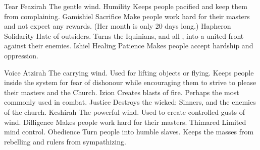 \begin{gloss}
\begin{description}
\begin{comment}
\subparagraph{Tear}
\end{comment}
\begin{sephirahlist}{Tear}
\sephitem
  {\Feazirah}
  {Feazirah}
  {\female}
  {The gentle wind.}
  {Humility}
  {Keeps people pacified and keep them from complaining.}
\sephitem
  {\Gamishiel}
  {Gamishiel}
  {\female}
  {}
  {Sacrifice}
  {Make people work hard for their masters and not expect any rewards. (Her month is only 20 days long.)}
\sephitem
  {\Hapheron}
  {Hapheron}
  {\male}
  {}
  {Solidarity}
  {Hate of outsiders. Turns the Iquinians, and all \humans, into a united front against their enemies.}
\sephitem
  {\Ishiel}
  {Ishiel}
  {\female}
  {Healing}
  {Patience}
  {Makes people accept hardship and oppression.}
\end{sephirahlist}





\begin{comment}
\subparagraph{Voice}
\end{comment}
\begin{sephirahlist}{Voice}
\sephitem
  {\Atzirah}
  {Atzirah}
  {\male}
  {The carrying wind. Used for lifting objects or flying.}
  {\Honour}
  {Keeps people inside the system for fear of dishonour while encouraging them to strive to please their masters and the Church.}
\sephitem
  {\Izion}
  {Izion}
  {\male}
  {Creates blasts of fire. Perhaps the \Sephirah{} most commonly used in combat. }
  {Justice}
  {Destroys the wicked: Sinners, and the enemies of the church.}
\sephitem
  {\Keshirah}
  {Keshirah}
  {\female}
  {The powerful wind. Used to create controlled gusts of wind. }
  {Dilligence}
  {Makes people work hard for their masters.}
\sephitem
  {\Thimared}
  {Thimared}
  {\female}
  {Limited mind control.}
  {Obedience}
  {Turn people into humble slaves. Keeps the masses from rebelling and rulers from sympathizing.}
\end{sephirahlist}
\end{description}













\end{gloss}
